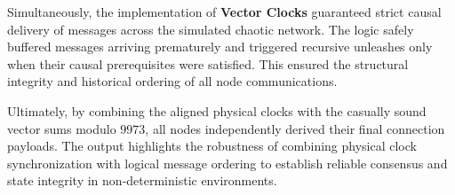 \documentclass[11pt]{article}
\begin{document}
Simultaneously, the implementation of \textbf{Vector Clocks} guaranteed strict causal delivery of messages across the simulated chaotic network. The logic safely buffered messages arriving prematurely and triggered recursive unleashes only when their causal prerequisites were satisfied. This ensured the structural integrity and historical ordering of all node communications.

Ultimately, by combining the aligned physical clocks with the casually sound vector sums modulo $9973$, all nodes independently derived their final connection payloads. The output highlights the robustness of combining physical clock synchronization with logical message ordering to establish reliable consensus and state integrity in non-deterministic environments.
\end{document}
